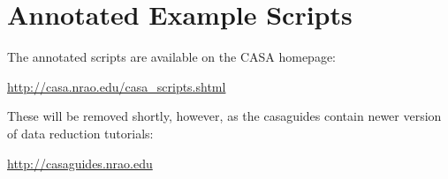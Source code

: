 

\chapter[Appendix: Annotated Example Scripts]{Annotated Example Scripts}
\label{chapter:scripts}
The annotated scripts are available on the CASA homepage: 

\url{http://casa.nrao.edu/casa_scripts.shtml}

These will be removed shortly, however, as the casaguides contain
newer version of data reduction tutorials:

\url{http://casaguides.nrao.edu}


